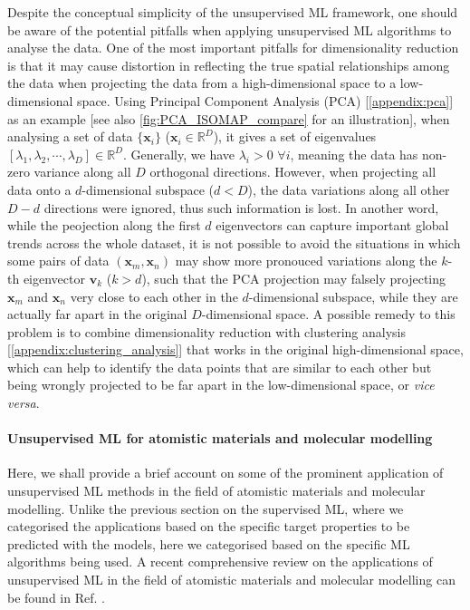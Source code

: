 Despite the conceptual simplicity of the unsupervised ML framework, one should be aware of the potential pitfalls when applying unsupervised ML algorithms to analyse the data. One of the most important pitfalls for dimensionality reduction is that it may cause distortion in reflecting the true spatial relationships among the data when projecting the data from a high-dimensional space to a low-dimensional space. Using Principal Component Analysis (PCA) [\cref{appendix:pca}] as an example [see also \cref{fig:PCA_ISOMAP_compare} for an illustration], when analysing a set of data $\{\bm{x}_i\}$ ($\bm{x}_i \in \mathbb{R}^D$), it gives a set of eigenvalues $[\lambda_1,\lambda_2,\cdots,\lambda_D]\in \mathbb{R}^D$. Generally, we have $\lambda_i>0$ $\forall i$, meaning the data has non-zero variance along all $D$ orthogonal directions. However, when projecting all data onto a $d$-dimensional subspace ($d<D$), the data variations along all other $D-d$ directions were ignored, thus such information is lost. In another word, while the peojection along the first $d$ eigenvectors can capture important global trends across the whole dataset, it is not possible to avoid the situations in which some pairs of data $(\bm{x}_m,\bm{x}_n)$ may show more pronouced variations along the $k$-th eigenvector $\bm{v}_k$ ($k>d$), such that the PCA projection may falsely projecting $\bm{x}_m$ and $\bm{x}_n$ very close to each other in the $d$-dimensional subspace, while they are actually far apart in the original $D$-dimensional space. A possible remedy to this problem is to combine dimensionality reduction with clustering analysis [\cref{appendix:clustering_analysis}] that works in the original high-dimensional space,\cite{musil2018machine} which can help to identify the data points that are similar to each other but being wrongly projected to be far apart in the low-dimensional space, or \emph{vice versa}. 

\paragraph{\textbf{Unsupervised ML for atomistic materials and molecular modelling}}

Here, we shall provide a brief account on some of the prominent application of unsupervised ML methods in the field of atomistic materials and molecular modelling. Unlike the previous section on the supervised ML, where we categorised the applications based on the specific target properties to be predicted with the models, here we categorised based on the specific ML algorithms being used. A recent comprehensive review on the applications of unsupervised ML in the field of atomistic materials and molecular modelling can be found in Ref. .


